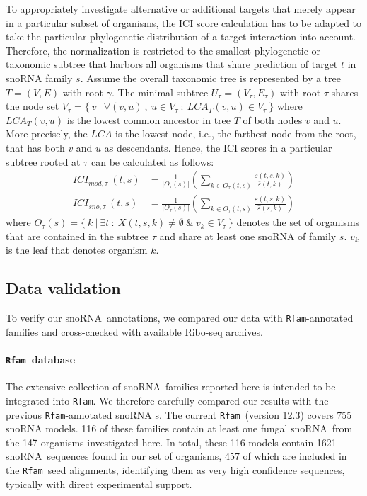 \documentclass[preprint,3p,times,twocolumn]{elsarticle}
\newcommand{\sno}{snoRNA}
\newcommand{\rfam}{\texttt{Rfam}}
\begin{document}
To appropriately investigate alternative or additional targets that
merely appear in a particular subset of organisms, the ICI score
calculation has to be adapted to take the particular phylogenetic
distribution of a target interaction into account. Therefore, the
normalization is restricted to the smallest phylogenetic or taxonomic
subtree that harbors all organisms that share prediction of target
$t$ in snoRNA family $s$.  Assume the overall taxonomic tree is
represented by a tree $T=(V,E)$ with root $\gamma$. The minimal
subtree $U_\tau = (V_\tau, E_\tau)$ with root $\tau$ shares the node
set
$V_\tau = \{\ v\ |\ \forall (v,u)\ ,\ u \in V_\tau\ :\ LCA_T(v,u) \in
V_\tau\ \}$ where $LCA_T(v,u)$ is the lowest common ancestor in tree
$T$ of both nodes $v$ and $u$. More precisely, the $LCA$ is the lowest
node, i.e., the farthest node from the root, that has both $v$ and $u$
as descendants.  Hence, the ICI scores in a particular subtree rooted
at $\tau$ can be calculated as follows:
\begin{equation}
  \begin{split}
    ICI_{mod,\tau}\:(t,s) & = \frac{1}{|O_\tau(s)|}  \left( \sum_{k\in O_\tau(t,s)} \frac{\varepsilon(t,s,k)}{\bar\varepsilon(t,k)} \right)
    \\
    ICI_{sno,\tau}\:(t,s) & = \frac{1}{|O_\tau(s)|}  \left( \sum_{k\in O_\tau(t,s)} \frac{\varepsilon(t,s,k)}{\hat\varepsilon(s,k)} \right)
  \end{split}
\end{equation}
where
$O_\tau(s) = \{\ k\ |\ \exists t\ :\ X(t,s,k) \ne \emptyset\ \&\ v_k
\in V_\tau\ \}$ denotes the set of organisms that are contained in the
subtree $\tau$ and share at least one snoRNA of family $s$. $v_k$ is
the leaf that denotes organism $k$.

\subsection{Data validation}

To verify our \sno\ annotations, we compared our data with
\rfam{}-annotated families and cross-checked with available Ribo-seq
archives.

\paragraph{\rfam\ database} The extensive collection of \sno\ families
reported here is intended to be integrated into \rfam.  We therefore
carefully compared our results with the previous \rfam -annotated \sno
s. The current \rfam\ (version 12.3) covers 755 snoRNA models. 116 of these
families contain at least one fungal \sno\ from the 147 organisms
investigated here. In total, these 116 models contain 1621 \sno\ sequences
found in our set of organisms, 457 of which are included in the \rfam\ seed
alignments, identifying them as very high confidence sequences, typically
with direct experimental support.
\end{document}
